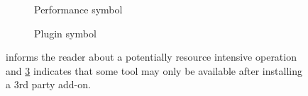 \begin{figure}[h!]
	\begin{centering}
		\begin{subfigure}{0.5\textwidth}
			
			\caption{Performance symbol}
			\label{fig:performance_icon}
		\end{subfigure}
		\begin{subfigure}{0.5\textwidth}
			
			\caption{Plugin symbol}
			\label{fig:plugin_icon}
		\end{subfigure}
	  \end{centering}
	  \caption{ informs the reader about a potentially resource intensive operation and \cref{fig:plugin_icon} indicates that some tool may only be available after installing a 3rd party add-on.}
\end{figure}








